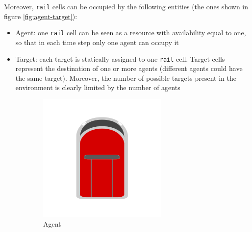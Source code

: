 \documentclass[a4paper,10pt]{report}
\begin{document}
Moreover, \texttt{rail} cells can be occupied by the following entities (the ones shown in figure \ref{fig:agent-target}):
\begin{itemize}
	\item Agent: one \texttt{rail} cell can be seen as a resource with availability equal to one, so that in each time step only one agent can occupy it
	\item Target: each target is statically assigned to one \texttt{rail} cell. Target cells represent the destination of one or more agents (different agents could have the same target). Moreover, the number of possible targets present in the environment is clearly limited by the number of agents
\end{itemize}

\begin{figure}[h]
	\centering
	\captionsetup[subfigure]{justification=centering}
	\begin{subfigure}[t]{.25\linewidth}
		\includegraphics[width=\textwidth]{agent.png}
		\caption{Agent}
		\label{fig:agent}
	\end{subfigure}%
	~
	\begin{subfigure}[t]{.25\linewidth}

\end{subfigure}
\end{figure}
\end{document}

